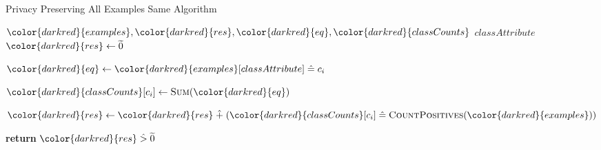 \begin{algorithm}[H]
\caption{Privacy Preserving All Examples Same Algorithm}\label{a:id3-same-pp}
\begin{algorithmic}[1]
\renewcommand{\algorithmicrequire}{\textbf{Private Vars:}}
\Require ${\color{darkred}{examples}}, {\color{darkred}{res}}, {\color{darkred}{eq}}, {\color{darkred}{classCounts}}$
\renewcommand{\algorithmicrequire}{\textbf{Global Vars:}}
\Require $classAttribute$
    \State ${\color{darkred}{res}} \gets  \enc{0}$


      \State ${\color{darkred}{eq}} \gets {\color{darkred}{examples}}[classAttribute] \heq c_i$ 

      \State ${\color{darkred}{classCounts}}[c_i] \gets \textsc{Sum}({\color{darkred}{eq}})$

      \State ${\color{darkred}{res}} \gets {\color{darkred}{res}} \hplus ({\color{darkred}{classCounts}}[c_i] \heq \textsc{CountPositives}({\color{darkred}{examples}}))$

    \EndFor

    \State \textbf{return} ${\color{darkred}{res}} \hgt \enc{0}$
\EndProcedure
\end{algorithmic}
\end{algorithm}
